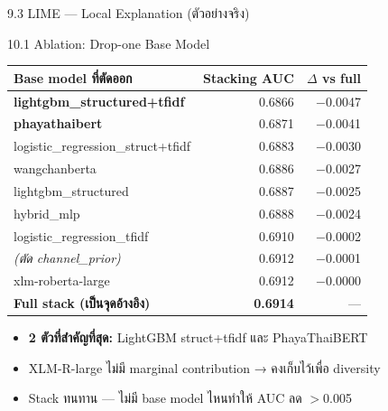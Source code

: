 \documentclass[aspectratio=169,11pt,xcolor=dvipsnames]{beamer}
\newcommand{\hl}[1]{\textcolor{kmitlOrange}{\textbf{#1}}}
\begin{document}
\begin{frame}{9.3 LIME — Local Explanation (ตัวอย่างจริง)}
\begin{center}
\begin{frame}{10.1 Ablation: Drop-one Base Model}
  \footnotesize
  \begin{tabular}{lrr}
    \toprule
    \textbf{Base model ที่ตัดออก} & \textbf{Stacking AUC} & \textbf{$\Delta$ vs full}\\
    \midrule
    \hl{lightgbm\_structured+tfidf}  & 0.6866 & $-$0.0047\\
    \hl{phayathaibert}               & 0.6871 & $-$0.0041\\
    logistic\_regression\_struct+tfidf & 0.6883 & $-$0.0030\\
    wangchanberta                     & 0.6886 & $-$0.0027\\
    lightgbm\_structured              & 0.6887 & $-$0.0025\\
    hybrid\_mlp                       & 0.6888 & $-$0.0024\\
    logistic\_regression\_tfidf       & 0.6910 & $-$0.0002\\
    \emph{(ตัด channel\_prior)}       & 0.6912 & $-$0.0001\\
    xlm-roberta-large                 & 0.6912 & $-$0.0000\\
    \midrule
    \textbf{Full stack (เป็นจุดอ้างอิง)} & \textbf{0.6914} & ---\\
    \bottomrule
  \end{tabular}
  \vspace{0.4em}
  \begin{itemize}
    \item \hl{2 ตัวที่สำคัญที่สุด:} LightGBM struct+tfidf และ PhayaThaiBERT
    \item XLM-R-large ไม่มี marginal contribution → คงเก็บไว้เพื่อ diversity
    \item Stack ทนทาน — ไม่มี base model ไหนทำให้ AUC ลด $>$0.005
  \end{itemize}
\end{frame}


\end{center}
\end{frame}
\end{document}
